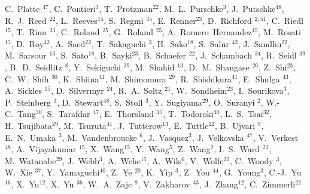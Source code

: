 \documentclass[type=preprint,linenumbering=off]{sphenix}
\begin{document}
\begin{flushleft}
C.~Platte\,\,$^{47}$,
C.~Pontieri$^{3}$,
T.~Protzman$^{22}$,
M.~L.~Purschke$^{3}$,
J.~Putschke$^{48}$,
R.~J.~Reed\,\,$^{22}$,
L.~Reeves$^{15}$,
S.~Regmi\,\,$^{35}$,
E.~Renner$^{23}$,
D.~Richford\,\,$^{2,51}$,
C.~Riedl\,\,$^{15}$,
T.~Rinn\,\,$^{23}$,
C.~Roland\,\,$^{25}$,
G.~Roland\,\,$^{25}$,
A.~Romero~Hernandez$^{15}$,
M.~Rosati\,\,$^{17}$,
D.~Roy$^{42}$,
A.~Saed$^{22}$,
T.~Sakaguchi\,\,$^{3}$,
H.~Sako$^{18}$,
S.~Salur\,\,$^{42}$,
J.~Sandhu$^{22}$,
M.~Sarsour\,\,$^{13}$,
S.~Sato$^{18}$,
B.~Sayki$^{23}$,
B.~Schaefer\,\,$^{22}$,
J.~Schambach\,\,$^{34}$,
R.~Seidl\,\,$^{39}$,
B.~D.~Seidlitz\,\,$^{8}$,
Y.~Sekiguchi\,\,$^{39}$,
M.~Shahid\,\,$^{13}$,
D.~M.~Shangase\,\,$^{26}$,
Z.~Shi$^{23}$,
C.~W.~Shih\,\,$^{30}$,
K.~Shiina$^{41}$,
M.~Shimomura\,\,$^{29}$,
R.~Shishikura$^{41}$,
E.~Shulga\,\,$^{43}$,
A.~Sickles\,\,$^{15}$,
D.~Silvermyr\,\,$^{24}$,
R.~A.~Soltz\,\,$^{21}$,
W.~Sondheim$^{23}$,
I.~Sourikova$^{3}$,
P.~Steinberg\,\,$^{3}$,
D.~Stewart$^{48}$,
S.~Stoll\,\,$^{3}$,
Y.~Sugiyama$^{29}$,
O.~Suranyi\,\,$^{2}$,
W.-C.~Tang$^{30}$,
S.~Tarafdar\,\,$^{47}$,
E.~Thorsland\,\,$^{15}$,
T.~Todoroki$^{40}$,
L.~S.~Tsai$^{32}$,
H.~Tsujibata$^{29}$,
M.~Tsuruta$^{41}$,
J.~Tutterow$^{13}$,
E.~Tuttle$^{22}$,
B.~Ujvari\,\,$^{9}$,
E.~N.~Umaka\,\,$^{3}$,
M.~Vandenbroucke\,\,$^{6}$,
J.~Vasquez$^{3}$,
J.~Velkovska\,\,$^{47}$,
V.~Verkest\,\,$^{48}$,
A.~Vijayakumar\,\,$^{15}$,
X.~Wang$^{15}$,
Y.~Wang$^{5}$,
Z.~Wang$^{2}$,
I.~S.~Ward\,\,$^{22}$,
M.~Watanabe$^{29}$,
J.~Webb$^{3}$,
A.~Wehe$^{15}$,
A.~Wils$^{6}$,
V.~Wolfe$^{22}$,
C.~Woody\,\,$^{3}$,
W.~Xie\,\,$^{37}$,
Y.~Yamaguchi$^{40}$,
Z.~Ye\,\,$^{20}$,
K.~Yip\,\,$^{3}$,
Z.~You\,\,$^{44}$,
G.~Young$^{3}$,
C.-J.~Yu$^{16}$,
X.~Yu$^{12}$,
X.~Yu\,\,$^{36}$,
W.~A.~Zajc\,\,$^{8}$,
V.~Zakharov\,\,$^{43}$,
J.~Zhang$^{12}$,
C.~Zimmerli$^{22}$


\end{flushleft}
\end{document}
